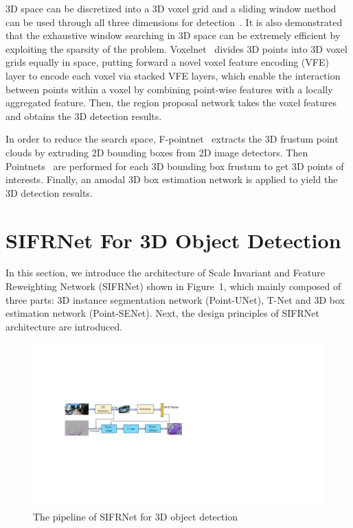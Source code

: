\documentclass[letterpaper]{article} %
\begin{document}
3D space can be discretized into a 3D voxel grid and a sliding window method can be used through all three dimensions for detection~\cite{wang2015voting}. It is also demonstrated that the exhaustive window searching in 3D space can be extremely efficient by exploiting the sparsity of the problem. Voxelnet~\cite{zhou2017voxelnet} divides 3D points into 3D voxel grids equally in space, putting forward a novel voxel feature encoding (VFE) layer to encode each voxel via stacked VFE layers, which enable the interaction between points within a voxel by combining point-wise features with a locally aggregated feature. Then, the region proposal network takes the voxel features and obtains the 3D detection results.

In order to reduce the search space, F-pointnet~\cite{qi2017frustum} extracts the 3D frustum point clouds by extruding 2D bounding boxes from 2D image detectors. Then Pointnets~\cite{qi2017pointnet,qi2017pointnet++} are performed for each 3D bounding box frustum to get 3D points of interests. Finally, an amodal 3D box estimation network is applied to yield the 3D detection results.

\section{SIFRNet For 3D Object Detection}
In this section, we introduce the architecture of Scale Invariant and Feature Reweighting Network (SIFRNet) shown in Figure~1, which mainly composed of three parts: 3D instance segmentation network (Point-UNet), T-Net and 3D box estimation network (Point-SENet). Next, the design principles of SIFRNet architecture are introduced.


\begin{figure}[t]
\begin{center}
  \includegraphics[width=0.95\linewidth]{full_arch_ok.pdf}
\end{center}
\caption{The pipeline of SIFRNet for 3D object detection}
\label{fig:The pipeline of SIFRNet for 3D object detection}%
\end{figure}
\end{document}
